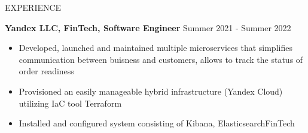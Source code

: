 \documentclass{resume} %
\begin{document}

\begin{rSection}{EXPERIENCE}


\textbf{Yandex LLC, FinTech, Software Engineer} \hfill Summer 2021 - Summer 2022
\begin{itemize}
    \item Developed, launched and maintained multiple microservices that simplifies communication between buisness and customers, allows to track the status of order readiness
    \item Provisioned an easily manageable hybrid infrastructure (Yandex Cloud) utilizing IaC tool Terraform
    \item Installed and configured system consisting of Kibana, ElasticsearchFinTech

\end{itemize}


\end{rSection}
\end{document}
